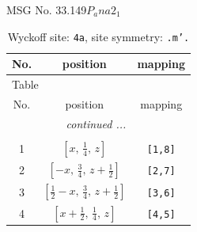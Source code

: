 \documentclass[fleqn,8pt]{jsarticle}
\begin{document}
\setcounter{MaxMatrixCols}{32}

\renewcommand{\tablename}{Table~}
\renewcommand{\figurename}{Figure~}
\begin{center}
\LARGE
MSG No. 33.149\quad$P_{a}na2_{1}$
\end{center}
\renewcommand{\arraystretch}{1.2}
\begin{longtable}{ccc}
\caption{Wyckoff site: {\tt 4a}, site symmetry: {\tt .m'.}}
 \\
 \hline \hline
No. & position & mapping \\ \hline \endfirsthead

\multicolumn{2}{l}{\tablename\ \thetable{}} \\
 \hline \hline
No. & position & mapping \\ \hline \endhead

 \hline \hline
\multicolumn{2}{r}{\footnotesize\it continued ...} \\ \endfoot

 \hline \hline
\multicolumn{2}{r}{} \\ \endlastfoot

1 & $\left[ x,\, \frac{1}{4},\, z \right]$ & {\tt [1,8]} \\ \hline
2 & $\left[ - x,\, \frac{3}{4},\, z + \frac{1}{2} \right]$ & {\tt [2,7]} \\ \hline
3 & $\left[ \frac{1}{2} - x,\, \frac{3}{4},\, z + \frac{1}{2} \right]$ & {\tt [3,6]} \\ \hline
4 & $\left[ x + \frac{1}{2},\, \frac{1}{4},\, z \right]$ & {\tt [4,5]} \\
\end{longtable}
\renewcommand{\arraystretch}{1.2}
\end{document}
